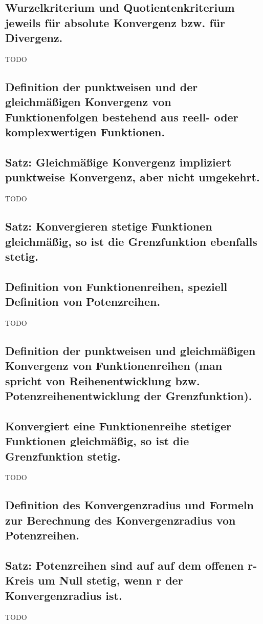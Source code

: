 \subsection{Wurzelkriterium und Quotientenkriterium jeweils für absolute Konvergenz bzw. für Divergenz.}
TODO
\subsection{Definition der punktweisen und der gleichmäßigen Konvergenz von Funktionenfolgen bestehend aus reell- oder komplexwertigen Funktionen.}

\subsection{Satz: Gleichmäßige Konvergenz impliziert punktweise Konvergenz, aber nicht umgekehrt.}
TODO
\subsection{Satz: Konvergieren stetige Funktionen gleichmäßig, so ist die Grenzfunktion ebenfalls stetig.}

\subsection{Definition von Funktionenreihen, speziell Definition von Potenzreihen.}
TODO
\subsection{Definition der punktweisen und gleichmäßigen Konvergenz von Funktionenreihen (man spricht von Reihenentwicklung bzw. Potenzreihenentwicklung der Grenzfunktion).}

\subsection{Konvergiert eine Funktionenreihe stetiger Funktionen gleichmäßig, so ist die Grenzfunktion stetig.}
TODO
\subsection{Definition des Konvergenzradius und Formeln zur Berechnung des Konvergenzradius von Potenzreihen.}

\subsection{Satz: Potenzreihen sind auf auf dem offenen r-Kreis um Null stetig, wenn r der Konvergenzradius ist.}
TODO
